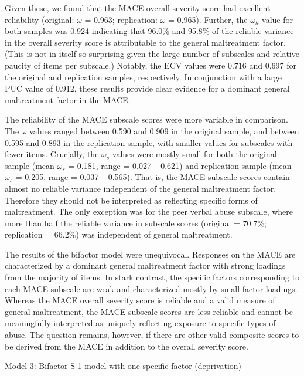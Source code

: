 \documentclass[letterpaper,man,natbib,floatsintext,longtable]{apa6}
\makeatletter
\renewcommand{\subsubsection}{\@startsection{subsubsection}{3}
  {\z@}%
  {\b@level@two@skip}{\e@level@two@skip}%
  {\normalfont\normalsize\bfseries}}
\makeatother
\begin{document}
Given these, we found that the MACE overall severity score had excellent reliability (original: $\omega$ = 0.963; replication: $\omega$ = 0.965). Further, the $\omega_h$ value for both samples was 0.924 indicating that 96.0\% and 95.8\% of the reliable variance in the overall severity score is attributable to the general maltreatment factor. (This is not in itself so surprising given the large number of subscales and relative paucity of items per subscale.) Notably, the ECV values were 0.716 and 0.697 for the original and replication samples, respectively. In conjunction with a large PUC value of 0.912, these results provide clear evidence for a dominant general maltreatment factor in the MACE. 

The reliability of the MACE subscale scores were more variable in comparison. The $\omega$ values ranged between 0.590 and 0.909 in the original sample, and between 0.595 and 0.893 in the replication sample, with smaller values for subscales with fewer items. Crucially, the $\omega_s$ values were mostly small for both the original sample (mean $\omega_s$ = 0.181, range = 0.027 -- 0.621) and replication sample (mean $\omega_s$ = 0.205, range = 0.037 -- 0.565). That is, the MACE subscale scores contain almost no reliable variance independent of the general maltreatment factor. Therefore they should not be interpreted as reflecting specific forms of maltreatment. The only exception was for the peer verbal abuse subscale, where more than half the reliable variance in subscale scores (original = 70.7\%; replication = 66.2\%) was independent of general maltreatment.

The results of the bifactor model were unequivocal. Responses on the MACE are characterized by a dominant general maltreatment factor with strong loadings from the majority of items. In stark contrast, the specific factors corresponding to each MACE subscale are weak and characterized mostly by small factor loadings. Whereas the MACE overall severity score is reliable and a valid measure of general maltreatment, the MACE subscale scores are less reliable and cannot be meaningfully interpreted as uniquely reflecting exposure to specific types of abuse. The question remains, however, if there are other valid composite scores to be derived from the MACE in addition to the overall severity score.

\subsubsection{Model 3: Bifactor S-1 model with one specific factor (deprivation)}
\end{document}
